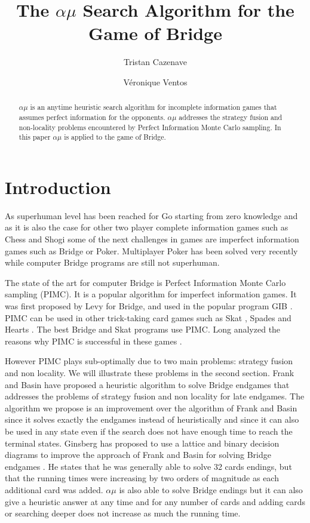 \documentclass{ecai}
\title{The $\alpha\mu$ Search Algorithm for the Game of Bridge}
\author{Tristan Cazenave \institute{LAMSADE Université Paris-Dauphine PSL CNRS, France, email: Tristan.Cazenave@dauphine.psl.eu} \and Véronique Ventos \institute{NUKKAI, Paris, France, email: vventos@nukk.ai}}
\begin{document}
\maketitle

\begin{abstract}
$\alpha\mu$ is an anytime heuristic search algorithm for incomplete
information games that assumes perfect information for the
opponents. $\alpha\mu$ addresses the strategy fusion and non-locality
problems encountered by Perfect Information Monte Carlo sampling. In
this paper $\alpha\mu$ is applied to the game of Bridge.
\end{abstract}

\section{Introduction}

As superhuman level has been reached for Go starting from zero
knowledge \cite{silver2017mastering} and as it is also the case for
other two player complete information games such as Chess and
Shogi \cite{silver2018general} some of the next challenges in games
are imperfect information games such as Bridge or Poker. Multiplayer
Poker has been solved very recently \cite{brown2019superhuman} while
computer Bridge programs are still not superhuman.

The state of the art for computer Bridge is Perfect Information Monte
Carlo sampling (PIMC). It is a popular algorithm for imperfect
information games. It was first proposed by
Levy \cite{levy1989million} for Bridge, and used in the popular
program GIB \cite{ginsberg2001}. PIMC can be used in other
trick-taking card games such as
Skat \cite{buro2009improving,kupferschmid2006skat}, Spades and
Hearts \cite{sturtevant2006feature}. The best Bridge and Skat programs
use PIMC. Long analyzed the reasons why PIMC is successful in these
games \cite{long2010understanding}.

However PIMC plays sub-optimally due to two main problems: strategy
fusion and non locality. We will illustrate these problems in the
second section. Frank and Basin \cite{frank2001theoretical} have
proposed a heuristic algorithm to solve Bridge endgames that addresses
the problems of strategy fusion and non locality for late
endgames. The algorithm we propose is an improvement over the
algorithm of Frank and Basin since it solves exactly the endgames
instead of heuristically and since it can also be used in any state
even if the search does not have enough time to reach the terminal
states. Ginsberg has proposed to use a lattice and binary decision
diagrams to improve the approach of Frank and Basin for solving Bridge
endgames \cite{ginsberg2001}. He states that he was generally able to
solve 32 cards endings, but that the running times were increasing by
two orders of magnitude as each additional card was added. $\alpha\mu$
is also able to solve Bridge endings but it can also give a heuristic
answer at any time and for any number of cards and adding cards or
searching deeper does not increase as much the running time.
\end{document}
